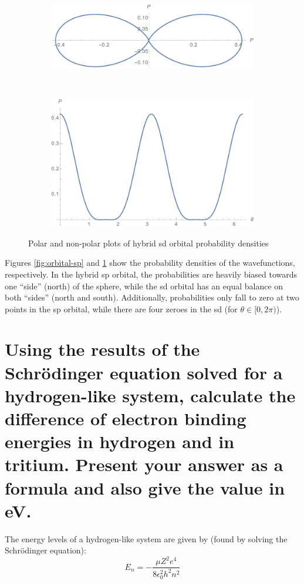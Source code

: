 \documentclass[a4paper]{scrartcl}
\begin{document}
\begin{figure}[h]
    \centering
    \begin{subfigure}[b]{0.45\textwidth}
        \includegraphics[width = \textwidth]{orbital-sd-polar.png}
    \end{subfigure}
    ~
    \begin{subfigure}[b]{0.45\textwidth}
        \includegraphics[width = \textwidth]{orbital-sd.png}
    \end{subfigure}
    \caption{Polar and non-polar plots of hybrid sd orbital probability densities}
    \label{fig:orbital-sd}
\end{figure}

Figures \ref{fig:orbital-sp} and \ref{fig:orbital-sd} show the probability densities of the wavefunctions, respectively. In the hybrid sp orbital, the probabilities are heavily biased towards one ``side'' (north) of the sphere, while the sd orbital has an equal balance on both ``sides'' (north and south). Additionally, probabilities only fall to zero at two points in the sp orbital, while there are four zeroes in the sd (for \(\theta \in [0, 2 \pi)\)).

\section{Using the results of the Schr\"odinger equation solved for a hydrogen-like system, calculate the difference of electron binding energies in hydrogen and in tritium. Present your answer as a formula and also give the value in \si{\electronvolt}.}
The energy levels of a hydrogen-like system are given by (found by solving the Schr\"odinger equation):
\[E_n = -\frac{\mu Z^2 e^4}{8 \epsilon_0^2 h^2 n^2}\]
\end{document}
